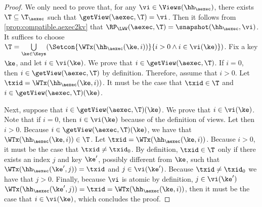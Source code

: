 \begin{proof}
We only need to prove that, for any $\vi \in \Views(\hh_{\aexec})$, there exists $\T \subseteq \T_{\aexec}$ such 
that $\getView(\aexec, \T) = \vi$. Then it follows from \cref{prop:compatible.aexec2kv} that 
$\RP_{\LWW}(\aexec, \T) = \snapshot(\hh_{\aexec}, \vi)$. 
It suffices to choose $\T = \bigcup\limits_{\ke \in \Keys}(\Setcon{ \WTx(\hh_{\aexec}(\ke, i)) }{ i > 0 
\wedge i \in \vi(\ke)})$.
Fix a key $\ke$, and let $i \in \vi(\ke)$. We prove that $i \in \getView(\aexec, \T)$. 
If $i = 0$, then $i \in \getView(\aexec, \T)$ by definition. 
Therefore, assume that $i > 0$. Let $\txid = \WTx(\hh_{\aexec}(\ke, i))$.
It must be the case that $\txid \in \T$ and $i \in \getView(\aexec, \T)(\ke)$.

Next, suppose that $i \in \getView(\aexec, \T)(\ke)$. We prove that $i \in \vi(\ke)$.
Note that if $i = 0$, then $i \in \vi(\ke)$ because of the 
definition of views. Let then $i > 0$. Because $i \in \getView(\aexec, \T)(\ke)$, we have that 
$\WTx(\hh_{\aexec}(\ke, i)) \in \T$.  Let $\txid = \WTx(\hh_{\aexec}(\ke, i))$. Because $i > 0$, 
it must be the case that $\txid \neq \txid_0$.
By definition, $\txid \in \T$ only if there 
exists an index $j$ and key $\ke'$, possibly different from $\ke$, such that $\WTx(\hh_{\aexec}(\ke', j)) = \txid$ and $j \in \vi(\ke')$. 
Because $\txid \neq \txid_0$ we have that $j > 0$. Finally, because $\vi$ is atomic by definition, $j \in \vi(\ke')$
$\WTx(\hh_{\aexec}(\ke', j)) = \txid = \WTx(\hh_{\aexec}(\ke, i))$, then it must be the case 
that $i \in \vi(\ke)$, which concludes the proof.
\end{proof}

